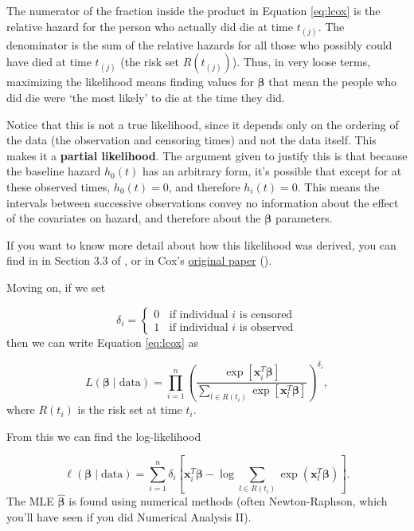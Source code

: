 \documentclass[
  openany]{book}
\theoremstyle{definition}
\theoremstyle{definition}
\theoremstyle{definition}
\theoremstyle{definition}
\theoremstyle{remark}
\begin{document}
The numerator of the fraction inside the product in Equation \eqref{eq:lcox} is the relative hazard for the person who actually did die at time \(t_{(j)}\). The denominator is the sum of the relative hazards for all those who possibly could have died at time \(t_{(j)}\) (the risk set \(R\left(t_{(j)}\right)\)). Thus, in very loose terms, maximizing the likelihood means finding values for \(\boldsymbol\beta\) that mean the people who did die were `the most likely' to die at the time they did.

Notice that this is not a true likelihood, since it depends only on the ordering of the data (the observation and censoring times) and not the data itself. This makes it a \textbf{partial likelihood}. The argument given to justify this is that because the baseline hazard \(h_0\left(t\right)\) has an arbitrary form, it's possible that except for at these observed times, \(h_0\left(t\right)=0\), and therefore \(h_i\left(t\right)=0\). This means the intervals between successive observations convey no information about the effect of the covariates on hazard, and therefore about the \(\boldsymbol\beta\) parameters.

If you want to know more detail about how this likelihood was derived, you can find in in Section 3.3 of \citet{collett_surv}, or in Cox's \href{https://www.jstor.org/stable/pdf/2985181.pdf}{original paper} (\citet{cox1972regression}).

Moving on, if we set

\[
\delta_i = 
\begin{cases}
0\;\;\text{ if individual }i\text{ is censored}\\
1\;\;\text{ if individual }i\text{ is observed}
\end{cases}
\]
then we can write Equation \eqref{eq:lcox} as

\[L\left(\boldsymbol\beta\mid{\text{data}}\right) =   \prod\limits_{i=1}^n\left(\frac{\exp\left[\mathbf{x}_i^T\boldsymbol\beta\right]}{\sum\limits_{l\in R\left(t_i\right)}{\exp\left[\mathbf{x}_l^T\boldsymbol\beta\right]}}\right)^{\delta_i},\]
where \(R\left(t_i\right)\) is the risk set at time \(t_i\).

From this we can find the log-likelihood

\[\ell\left(\boldsymbol\beta\mid{\text{data}}\right) = \sum\limits_{i=1}^n \delta_i\left[\mathbf{x}_i^T\boldsymbol\beta - \log\sum\limits_{l\in R\left(t_i\right)}\exp\left(\mathbf{x}_l^T\boldsymbol\beta\right)\right].\]
The MLE \(\hat{\boldsymbol\beta}\) is found using numerical methods (often Newton-Raphson, which you'll have seen if you did Numerical Analysis II).
\end{document}
